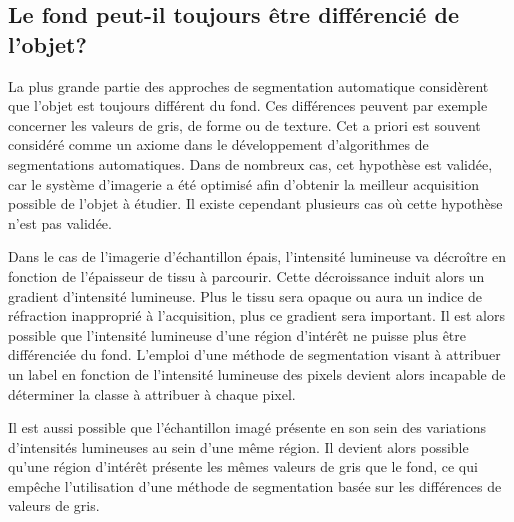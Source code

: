 \documentclass[\main/main.tex]{subfiles}
\begin{document}
    \subsection[limite de ces approches]{Le fond peut\hyp{}il toujours être différencié  de l'objet?}

%
La plus grande partie des approches de segmentation automatique considèrent que l'objet est toujours différent du fond. Ces différences peuvent par exemple concerner les valeurs de gris, de forme ou de texture.
%
Cet a priori est souvent considéré comme un axiome dans le développement d'algorithmes de segmentations automatiques.
%
Dans de nombreux cas, cet hypothèse est validée, car le système d'imagerie a été optimisé afin d'obtenir la meilleur acquisition possible de l'objet à étudier.
%
Il existe cependant plusieurs cas où cette hypothèse n'est pas validée.

%
Dans le cas de l'imagerie d'échantillon épais, l'intensité lumineuse va décroître en fonction de l'épaisseur de tissu à parcourir.
%
Cette décroissance induit alors un gradient d'intensité lumineuse.
%
Plus le tissu sera opaque ou aura un indice de réfraction inapproprié à l'acquisition, plus ce gradient sera important.
%
Il est alors possible que l'intensité lumineuse d'une région d'intérêt ne puisse plus être différenciée du fond.
%
L'emploi d'une méthode de segmentation visant à attribuer un label en fonction de l'intensité lumineuse des pixels devient alors incapable de déterminer la classe à attribuer à chaque pixel.

%
Il est aussi possible que l'échantillon imagé présente en son sein des variations d'intensités lumineuses au sein d'une même région.
%
Il devient alors possible qu'une région d'intérêt présente les mêmes valeurs de gris que le fond, ce qui empêche l'utilisation d'une méthode de segmentation basée sur les différences de valeurs de gris.
\end{document}
